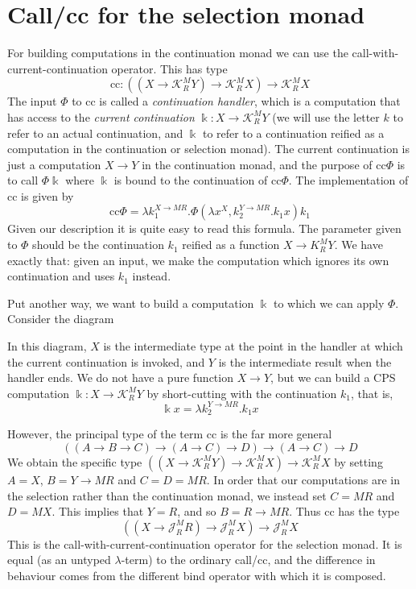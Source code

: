 \documentclass{article}
\newcommand\J{\mathscr J}
\newcommand\K{\mathscr K}
\newcommand\callcc{\text{c}\!\text{c}}
\begin{document}
\section{Call/cc for the selection monad}\label{callcc1}


For building computations in the continuation monad we can use the call-with-current-continuation operator. This has type
\[ \callcc : ((X \to \K^M_R Y) \to \K^M_R X) \to \K^M_R X \]
The input $\Phi$ to $\callcc$ is called a \emph{continuation handler}, which is a computation that has access to the \emph{current continuation} $\Bbbk : X \to \K^M_R Y$ (we will use the letter $k$ to refer to an actual continuation, and $\Bbbk$ to refer to a continuation reified as a computation in the continuation or selection monad). The current continuation is just a computation $X \to Y$ in the continuation monad, and the purpose of $\callcc \Phi$ is to call $\Phi \Bbbk$ where $\Bbbk$ is bound to the continuation of $\callcc \Phi$. The implementation of $\callcc$ is given by
\[ \callcc \Phi = \lambda k_1^{X \to MR} . \Phi (\lambda x^X, k_2^{Y \to MR} . k_1 x) k_1 \]
Given our description it is quite easy to read this formula. The parameter given to $\Phi$ should be the continuation $k_1$ reified as a function $X \to K^M_R Y$. We have exactly that: given an input, we make the computation which ignores its own continuation and uses $k_1$ instead.

Put another way, we want to build a computation $\Bbbk$ to which we can apply $\Phi$. Consider the diagram
\begin{center}\end{center}
In this diagram, $X$ is the intermediate type at the point in the handler at which the current continuation is invoked, and $Y$ is the intermediate result when the handler ends. We do not have a pure function $X \to Y$, but we can build a CPS computation $\Bbbk : X \to \K^M_R Y$ by short-cutting with the continuation $k_1$, that is,
\[ \Bbbk x = \lambda k_2^{Y \to MR} . k_1 x \]

However, the principal type of the term $\callcc$ is the far more general
\[ ((A \to B \to C) \to (A \to C) \to D) \to (A \to C) \to D \]
We obtain the specific type $((X \to \K^M_R Y) \to \K^M_R X) \to \K^M_R X$ by setting $A = X$, $B = Y \to MR$ and $C = D = MR$. In order that our computations are in the selection rather than the continuation monad, we instead set $C = MR$ and $D = MX$. This implies that $Y = R$, and so $B = R \to MR$. Thus $\callcc$ has the type
\[ ((X \to \J^M_R R) \to \J^M_R X) \to \J^M_R X \]
This is the call-with-current-continuation operator for the selection monad. It is equal (as an untyped $\lambda$-term) to the ordinary call/cc, and the difference in behaviour comes from the different bind operator with which it is composed.
\end{document}
